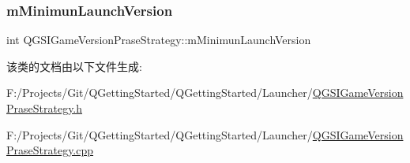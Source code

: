 \subsubsection{\texorpdfstring{m\+Minimun\+Launch\+Version}{mMinimunLaunchVersion}}
{\footnotesize\ttfamily int Q\+G\+S\+I\+Game\+Version\+Prase\+Strategy\+::m\+Minimun\+Launch\+Version\hspace{0.3cm}{\ttfamily [protected]}}



该类的文档由以下文件生成\+:\begin{DoxyCompactItemize}
\item 
F\+:/\+Projects/\+Git/\+Q\+Getting\+Started/\+Q\+Getting\+Started/\+Launcher/\mbox{\hyperlink{_q_g_s_i_game_version_prase_strategy_8h}{Q\+G\+S\+I\+Game\+Version\+Prase\+Strategy.\+h}}\item 
F\+:/\+Projects/\+Git/\+Q\+Getting\+Started/\+Q\+Getting\+Started/\+Launcher/\mbox{\hyperlink{_q_g_s_i_game_version_prase_strategy_8cpp}{Q\+G\+S\+I\+Game\+Version\+Prase\+Strategy.\+cpp}}\end{DoxyCompactItemize}
